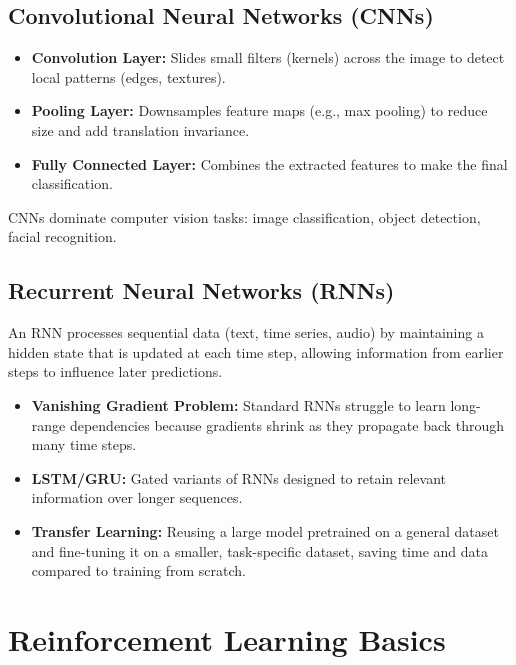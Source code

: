 \documentclass[11pt,a4paper]{article}
\begin{document}
\subsection{Convolutional Neural Networks (CNNs)}
\begin{conceptbox}
\begin{itemize}[leftmargin=*]
  \item \textbf{Convolution Layer:} Slides small filters (kernels) across the image to detect local patterns (edges, textures).
  \item \textbf{Pooling Layer:} Downsamples feature maps (e.g., max pooling) to reduce size and add translation invariance.
  \item \textbf{Fully Connected Layer:} Combines the extracted features to make the final classification.
\end{itemize}
CNNs dominate computer vision tasks: image classification, object detection, facial recognition.
\end{conceptbox}

\subsection{Recurrent Neural Networks (RNNs)}
\begin{definitionbox}
An RNN processes sequential data (text, time series, audio) by maintaining a hidden state that is updated at each time step, allowing information from earlier steps to influence later predictions.
\end{definitionbox}
\begin{itemize}[leftmargin=*]
  \item \textbf{Vanishing Gradient Problem:} Standard RNNs struggle to learn long-range dependencies because gradients shrink as they propagate back through many time steps.
  \item \textbf{LSTM/GRU:} Gated variants of RNNs designed to retain relevant information over longer sequences.
  \item \textbf{Transfer Learning:} Reusing a large model pretrained on a general dataset and fine-tuning it on a smaller, task-specific dataset, saving time and data compared to training from scratch.
\end{itemize}

\section{Reinforcement Learning Basics}
\end{document}
